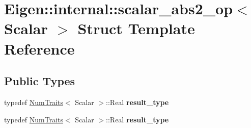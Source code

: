 \hypertarget{struct_eigen_1_1internal_1_1scalar__abs2__op}{}\section{Eigen\+:\+:internal\+:\+:scalar\+\_\+abs2\+\_\+op$<$ Scalar $>$ Struct Template Reference}
\label{struct_eigen_1_1internal_1_1scalar__abs2__op}
\subsection*{Public Types}
\begin{DoxyCompactItemize}
\item 
\mbox{\label{struct_eigen_1_1internal_1_1scalar__abs2__op_a8a20e6a78a8d74957a7d93c124f7714d}} 
typedef \hyperlink{group___core___module_struct_eigen_1_1_num_traits}{Num\+Traits}$<$ Scalar $>$\+::Real {\bfseries result\+\_\+type}
\item 
\mbox{\label{struct_eigen_1_1internal_1_1scalar__abs2__op_a8a20e6a78a8d74957a7d93c124f7714d}} 
typedef \hyperlink{group___core___module_struct_eigen_1_1_num_traits}{Num\+Traits}$<$ Scalar $>$\+::Real {\bfseries result\+\_\+type}
\end{DoxyCompactItemize}
